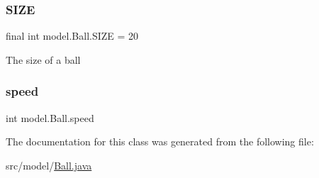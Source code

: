 \hypertarget{classmodel_1_1_ball_ad9a73bce4f016c2bd11fb037bac835c7}{}\label{classmodel_1_1_ball_ad9a73bce4f016c2bd11fb037bac835c7} 
\subsubsection{\texorpdfstring{S\+I\+ZE}{SIZE}}
{\footnotesize\ttfamily final int model.\+Ball.\+S\+I\+ZE = 20\hspace{0.3cm}{\ttfamily [private]}}

The size of a ball \hypertarget{classmodel_1_1_ball_a6952fd152ab74c481570678ba240e471}{}\label{classmodel_1_1_ball_a6952fd152ab74c481570678ba240e471} 
\subsubsection{\texorpdfstring{speed}{speed}}
{\footnotesize\ttfamily int model.\+Ball.\+speed\hspace{0.3cm}{\ttfamily [private]}}



The documentation for this class was generated from the following file\+:\begin{DoxyCompactItemize}
\item 
src/model/\hyperlink{_ball_8java}{Ball.\+java}\end{DoxyCompactItemize}
